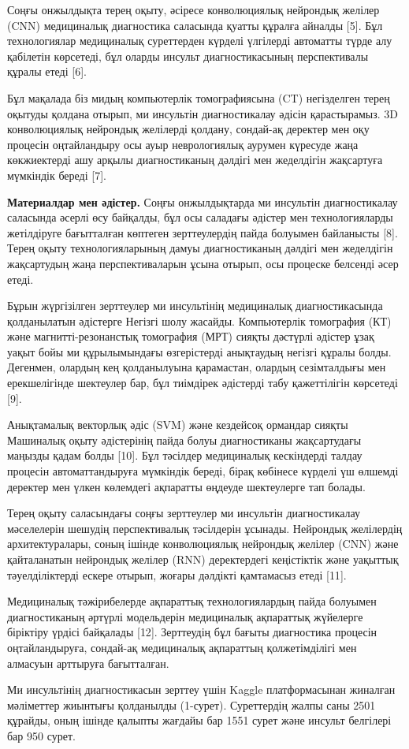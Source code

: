 \begin{multicols}{2}
Соңғы онжылдықта терең оқыту, әсіресе конволюциялық нейрондық желілер
(CNN) медициналық диагностика саласында қуатты құралға айналды {[}5{]}.
Бұл технологиялар медициналық суреттерден күрделі үлгілерді автоматты
түрде алу қабілетін көрсетеді, бұл оларды инсульт диагностикасының
перспективалы құралы етеді {[}6{]}.

Бұл мақалада біз мидың компьютерлік томографиясына (CT) негізделген
терең оқытуды қолдана отырып, ми инсультін диагностикалау әдісін
қарастырамыз. 3D конволюциялық нейрондық желілерді қолдану, сондай-ақ
деректер мен оқу процесін оңтайландыру осы ауыр неврологиялық аурумен
күресуде жаңа көкжиектерді ашу арқылы диагностиканың дәлдігі мен
жеделдігін жақсартуға мүмкіндік береді {[}7{]}.

{\bfseries Материалдар мен әдістер.} Соңғы онжылдықтарда ми инсультін
диагностикалау саласында әсерлі өсу байқалды, бұл осы саладағы әдістер
мен технологияларды жетілдіруге бағытталған көптеген зерттеулердің пайда
болуымен байланысты {[}8{]}. Терең оқыту технологияларының дамуы
диагностиканың дәлдігі мен жеделдігін жақсартудың жаңа перспективаларын
ұсына отырып, осы процеске белсенді әсер етеді.

Бұрын жүргізілген зерттеулер ми инсультінің медициналық диагностикасында
қолданылатын әдістерге Негізгі шолу жасайды. Компьютерлік томография
(КТ) және магнитті-резонанстық томография (МРТ) сияқты дәстүрлі әдістер
ұзақ уақыт бойы ми құрылымындағы өзгерістерді анықтаудың негізгі құралы
болды. Дегенмен, олардың кең қолданылуына қарамастан, олардың
сезімталдығы мен ерекшелігінде шектеулер бар, бұл тиімдірек әдістерді
табу қажеттілігін көрсетеді {[}9{]}.

Анықтамалық векторлық әдіс (SVM) және кездейсоқ ормандар сияқты
Машиналық оқыту әдістерінің пайда болуы диагностиканы жақсартудағы
маңызды қадам болды {[}10{]}. Бұл тәсілдер медициналық кескіндерді
талдау процесін автоматтандыруға мүмкіндік береді, бірақ көбінесе
күрделі үш өлшемді деректер мен үлкен көлемдегі ақпаратты өңдеуде
шектеулерге тап болады.

Терең оқыту саласындағы соңғы зерттеулер ми инсультін диагностикалау
мәселелерін шешудің перспективалық тәсілдерін ұсынады. Нейрондық
желілердің архитектуралары, соның ішінде конволюциялық нейрондық желілер
(CNN) және қайталанатын нейрондық желілер (RNN) деректердегі кеңістіктік
және уақыттық тәуелділіктерді ескере отырып, жоғары дәлдікті қамтамасыз
етеді {[}11{]}.

Медициналық тәжірибелерде ақпараттық технологиялардың пайда болуымен
диагностиканың әртүрлі модельдерін медициналық ақпараттық жүйелерге
біріктіру үрдісі байқалады {[}12{]}. Зерттеудің бұл бағыты диагностика
процесін оңтайландыруға, сондай-ақ медициналық ақпараттың қолжетімділігі
мен алмасуын арттыруға бағытталған.

Ми инсультінің диагностикасын зерттеу үшін Kaggle платформасынан
жиналған мәліметтер жиынтығы қолданылды (1-сурет). Суреттердің жалпы
саны 2501 құрайды, оның ішінде қалыпты жағдайы бар 1551 сурет және
инсульт белгілері бар 950 сурет.
\end{multicols}

